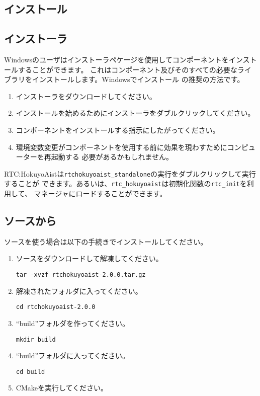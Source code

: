 \documentclass[a4paper,10pt]{article}
\newenvironment{Japanese}{%
  \CJKfamily{min}%
  \CJKtilde
  \CJKnospace}{}
\begin{document}
\begin{CJK}{UTF8}{}
\begin{Japanese}
\section{インストール}
\label{sec:installation}

\subsection{インストーラ}

Windowsのユーザはインストーラペケージを使用してコンポーネントをインストールすることができます。
これはコンポーネント及びそのすべての必要なライブラリをインストールします。Windowsでインストール
の推奨の方法です。

\begin{enumerate}
  \item インストーラをダウンロードしてください。
  \item インストールを始めるためにインストーラをダブルクリックしてください。
  \item コンポーネントをインストールする指示にしたがってください。
  \item 環境変数変更がコンポーネントを使用する前に効果を現わすためにコンピューターを再起動する
必要があるかもしれません。
\end{enumerate}

RTC:HokuyoAistは\verb|rtchokuyoaist_standalone|の実行をダブルクリックして実行することが
できます。あるいは、\verb|rtc_hokuyoaist|は初期化関数の\verb|rtc_init|を利用して、
マネージャにロードすることができます。

\subsection{ソースから}

ソースを使う場合は以下の手続きでインストールしてください。

\begin{enumerate}
  \item ソースをダウンロードして解凍してください。

  \verb|tar -xvzf rtchokuyoaist-2.0.0.tar.gz|
  \item 解凍されたフォルダに入ってください。

  \verb|cd rtchokuyoaist-2.0.0|
  \item ``build''フォルダを作ってください。

  \verb|mkdir build|
  \item ``build''フォルダに入ってください。

  \verb|cd build|
  \item CMakeを実行してください。


\end{enumerate}
\end{Japanese}
\end{CJK}
\end{document}
